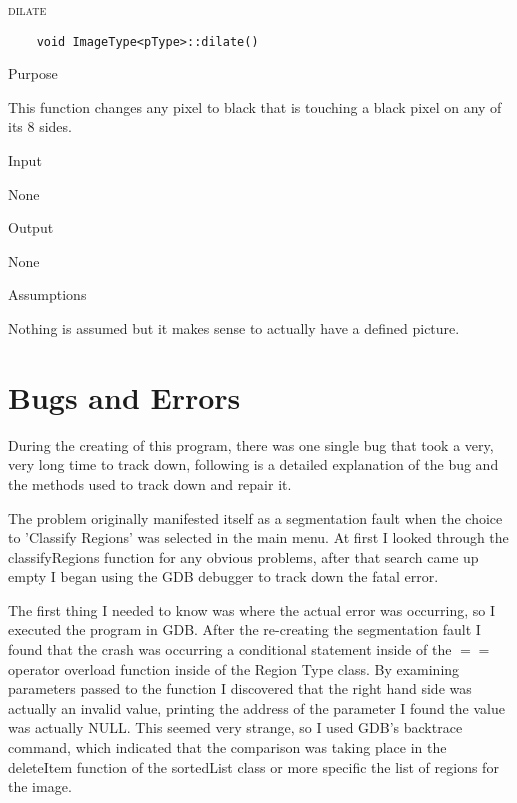 \documentclass[pdftex, 11pt]{article}
\begin{document}
\begin{description}

		\item{\textsc{dilate}}
			\begin{description}

	\begin{lstlisting}
	void ImageType<pType>::dilate()
	\end{lstlisting}

				\item{Purpose}

					This function changes any pixel to black that is
					touching a black pixel on any of its 8 sides.

				\item{Input}

					None

				\item{Output}

					None

				\item{Assumptions}

					Nothing is assumed but it makes sense to
					actually have a defined picture.

			\end{description}

\end{description}

\section{Bugs and Errors}

During the creating of this program, there was one single bug that took a very, very long time to track down, following
is a detailed explanation of the bug and the methods used to track down and repair it.

The problem originally manifested itself as a segmentation fault when the choice to 'Classify Regions' was selected in
the main menu.  At first I looked through the classifyRegions function for any obvious problems, after that search came
up empty I began using the GDB debugger to track down the fatal error.

The first thing I needed to know was where the actual error was occurring, so I executed the program in GDB.  After the
re-creating the segmentation fault I found that the crash was occurring a conditional statement inside of the $==$
operator overload function inside of the Region Type class.  By examining parameters passed to the function I discovered
that the right hand side was actually an invalid value, printing the address of the parameter I found the value was
actually NULL.  This seemed very strange, so I used GDB's backtrace command, which indicated that the comparison was
taking place in the deleteItem function of the sortedList class or more specific the list of regions for the image.
\end{document}
